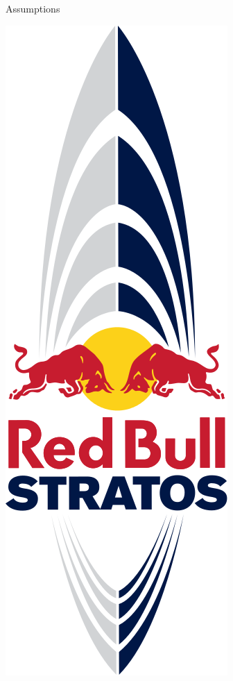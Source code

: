 \documentclass[final]{beamer}
\newlength{\onecolwid}
\begin{document}
\begin{frame}
\begin{columns}[t]
\begin{column}{\onecolwid}
\begin{exampleblock}{Assumptions}
\begin{center}
    \includegraphics[scale=0.5]{img/Red_Bull_Stratos_logo.png}
\end{center}

\end{exampleblock}


\end{column} %


\end{columns}
\end{frame}
\end{document}
